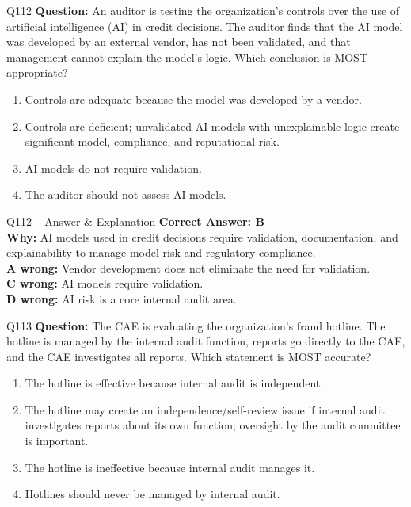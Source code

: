 \documentclass[aspectratio=169,10pt]{beamer}
\begin{document}
	\begin{frame}[t]{Q112}
		\small
		\textbf{Question:} An auditor is testing the organization's controls over the use of artificial intelligence (AI) in credit decisions. The auditor finds that the AI model was developed by an external vendor, has not been validated, and that management cannot explain the model's logic. Which conclusion is MOST appropriate?
		\begin{enumerate}[label=\Alph*.,itemsep=1pt,topsep=2pt]
			\item Controls are adequate because the model was developed by a vendor.
			\item Controls are deficient; unvalidated AI models with unexplainable logic create significant model, compliance, and reputational risk.
			\item AI models do not require validation.
			\item The auditor should not assess AI models.
		\end{enumerate}
	\end{frame}
	
	\begin{frame}[t]{Q112 -- Answer \& Explanation}
		\small
		\textbf{Correct Answer: B} \\[4pt]
		\textbf{Why:} AI models used in credit decisions require validation, documentation, and explainability to manage model risk and regulatory compliance. \\[4pt]
		\textbf{A wrong:} Vendor development does not eliminate the need for validation. \\[2pt]
		\textbf{C wrong:} AI models require validation. \\[2pt]
		\textbf{D wrong:} AI risk is a core internal audit area.
	\end{frame}
	
	\begin{frame}[t]{Q113}
		\small
		\textbf{Question:} The CAE is evaluating the organization's fraud hotline. The hotline is managed by the internal audit function, reports go directly to the CAE, and the CAE investigates all reports. Which statement is MOST accurate?
		\begin{enumerate}[label=\Alph*.,itemsep=1pt,topsep=2pt]
			\item The hotline is effective because internal audit is independent.
			\item The hotline may create an independence/self-review issue if internal audit investigates reports about its own function; oversight by the audit committee is important.
			\item The hotline is ineffective because internal audit manages it.
			\item Hotlines should never be managed by internal audit.
		\end{enumerate}
	\end{frame}
	
\end{document}
